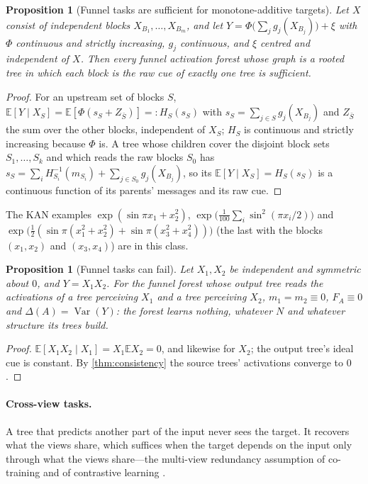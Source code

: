 \documentclass[11pt]{article}
\newtheorem{proposition}[theorem]{Proposition}
\theoremstyle{definition}
\theoremstyle{remark}
\newcommand{\E}{\mathbb{E}}
\newcommand{\Var}{\operatorname{Var}}
\begin{document}
\begin{proposition}[Funnel tasks are sufficient for monotone-additive targets]\label{prop:suffclass}
Let $X$ consist of independent blocks $X_{B_1},\dots,X_{B_m}$, and let
$Y=\Phi\bigl(\sum_jg_j(X_{B_j})\bigr)+\xi$ with $\Phi$ continuous and strictly increasing,
$g_j$ continuous, and $\xi$ centred and independent of $X$.  Then every funnel
activation forest whose graph is a rooted tree in which each block is the raw cue of
exactly one tree is sufficient.
\end{proposition}
\begin{proof}
For an upstream set of blocks $S$, $\E[Y\mid X_S]=\E[\Phi(s_S+Z_{\bar S})]=:H_S(s_S)$ with
$s_S=\sum_{j\in S}g_j(X_{B_j})$ and $Z_{\bar S}$ the sum over the other blocks, independent
of $X_S$; $H_S$ is continuous and strictly increasing because $\Phi$ is.  A tree whose
children cover the disjoint block sets $S_1,\dots,S_k$ and which reads the raw blocks $S_0$
has $s_S=\sum_iH_{S_i}^{-1}(m_{S_i})+\sum_{j\in S_0}g_j(X_{B_j})$, so its
$\E[Y\mid X_S]=H_S(s_S)$ is a continuous function of its parents' messages and its raw
cue.
\end{proof}

The KAN examples $\exp(\sin\pi x_1+x_2^2)$, $\exp\bigl(\tfrac1{100}\sum_i\sin^2(\pi x_i/2)\bigr)$
and $\exp\bigl(\tfrac12(\sin\pi(x_1^2+x_2^2)+\sin\pi(x_3^2+x_4^2))\bigr)$ (the last with
the blocks $(x_1,x_2)$ and $(x_3,x_4)$) are in this class.

\begin{proposition}[Funnel tasks can fail]\label{prop:xy}
Let $X_1,X_2$ be independent and symmetric about $0$, and $Y=X_1X_2$.  For the funnel
forest whose output tree reads the activations of a tree perceiving $X_1$ and a tree
perceiving $X_2$, $m_1=m_2\equiv0$, $F_A\equiv0$ and $\Delta(A)=\Var(Y)$: the forest
learns nothing, whatever $N$ and whatever structure its trees build.
\end{proposition}
\begin{proof}
$\E[X_1X_2\mid X_1]=X_1\E X_2=0$, and likewise for $X_2$; the output tree's ideal cue is
constant.  By \cref{thm:consistency} the source trees' activations converge to $0$.
\end{proof}

\paragraph{Cross-view tasks.}
A tree that predicts another part of the input never sees the target.  It recovers what
the views share, which suffices when the target depends on the input only through what
the views share---the multi-view redundancy assumption of co-training and of
contrastive learning \citep{blum1998,tosh2021}.
\end{document}
